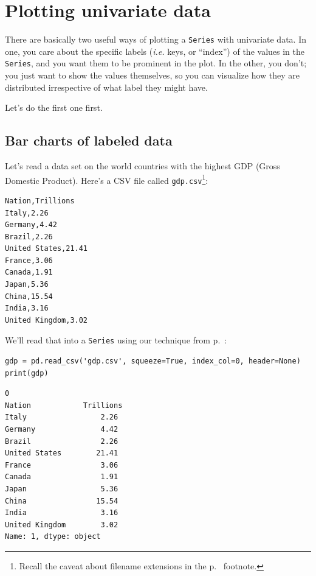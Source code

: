 \section{Plotting univariate data}

\label{twoWaysToPlotUnivariateData}

There are basically two useful ways of plotting a \texttt{Series} with
univariate data. In one, you care about the specific labels (\textit{i.e.}
keys, or ``index'') of the values in the \texttt{Series}, and you want them to
be prominent in the plot. In the other, you don't; you just want to show the
values themselves, so you can visualize how they are distributed irrespective
of what label they might have.

Let's do the first one first.

\subsection{Bar charts of labeled data}


Let's read a data set on the world countries with the highest GDP (Gross
Domestic Product). Here's a CSV file called \texttt{gdp.csv}\footnote{Recall
the caveat about filename extensions in the p.~\pageref{extensions} footnote.}:

\begin{Verbatim}[fontsize=\small,samepage=true,frame=single,framesep=3mm]
Nation,Trillions
Italy,2.26
Germany,4.42
Brazil,2.26
United States,21.41
France,3.06
Canada,1.91
Japan,5.36
China,15.54
India,3.16
United Kingdom,3.02
\end{Verbatim}


We'll read that into a \texttt{Series} using our technique from
p.~\pageref{read_csv}:

\begin{Verbatim}[fontsize=\small,samepage=true,frame=single,framesep=3mm]
gdp = pd.read_csv('gdp.csv', squeeze=True, index_col=0, header=None)
print(gdp)
\end{Verbatim}
\vspace{-.3in}

\begin{Verbatim}[fontsize=\small,samepage=true,frame=leftline,framesep=5mm,framerule=1mm]
0
Nation            Trillions
Italy                 2.26
Germany               4.42
Brazil                2.26
United States        21.41
France                3.06
Canada                1.91
Japan                 5.36
China                15.54
India                 3.16
United Kingdom        3.02
Name: 1, dtype: object
\end{Verbatim}


